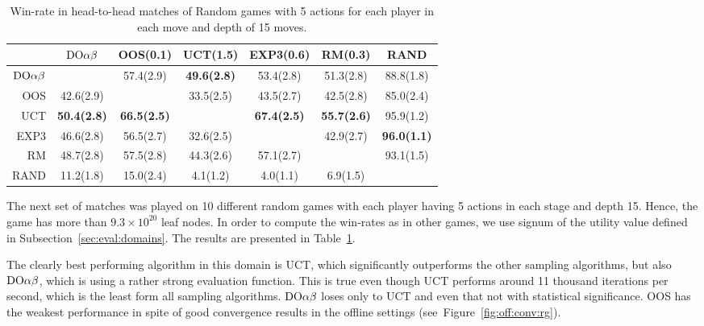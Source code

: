 \begin{table}
\centering
\begin{scriptsize}

\begin{tabular}{|r|cccccc|}\hline
&$\textrm{DO}\alpha\beta$&OOS(0.1)&UCT(1.5)&EXP3(0.6)&RM(0.3)&RAND\\\hline
$\textrm{DO}\alpha\beta$&&57.4(2.9)&\textbf{49.6(2.8)}&53.4(2.8)&51.3(2.8)&88.8(1.8)\\
OOS&42.6(2.9)&&33.5(2.5)&43.5(2.7)&42.5(2.8)&85.0(2.4)\\
UCT&\textbf{50.4(2.8)}&\textbf{66.5(2.5)}&&\textbf{67.4(2.5)}&\textbf{55.7(2.6)}&95.9(1.2)\\
EXP3&46.6(2.8)&56.5(2.7)&32.6(2.5)&&42.9(2.7)&\textbf{96.0(1.1)}\\
RM&48.7(2.8)&57.5(2.8)&44.3(2.6)&57.1(2.7)&&93.1(1.5)\\
RAND&11.2(1.8)&15.0(2.4)&4.1(1.2)&4.0(1.1)&6.9(1.5)&\\
\hline
\end{tabular}

\end{scriptsize}
\caption{Win-rate in head-to-head matches of Random games with 5 actions for each player in each move and depth of 15 moves.}\label{fig:matches:rand}
\end{table}


The next set of matches was played on 10 different random games with each player having 5 actions in each stage and depth 15. Hence, the game has more than $9.3\times 10^{20}$ leaf nodes. In order to compute the win-rates as in other games, we use signum of the utility value defined in Subsection~\ref{sec:eval:domains}. The results are presented in Table~\ref{fig:matches:rand}.

The clearly best performing algorithm in this domain is UCT, which significantly outperforms the other sampling algorithms, but also $\textrm{DO}\alpha\beta$, which is using a rather strong evaluation function.
This is true even though UCT performs around 11 thousand iterations per second, which is the least form all sampling algorithms.
$\textrm{DO}\alpha\beta$ loses only to UCT and even that not with statistical significance.
OOS has the weakest performance in spite of good convergence results in the offline settings (see~Figure~\ref{fig:off:conv:rg}).

